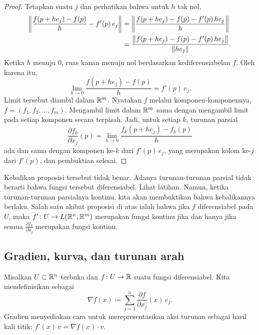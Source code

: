 \begin{proof}
Tetapkan suatu $j$ dan perhatikan bahwa untuk $h$ tak nol,
\begin{equation*}
\begin{split}
\left\lVert {\frac{f(p+h e_j)-f(p)}{h} - f'(p) \, e_j} \right\rVert & = 
\left\lVert {\frac{f(p+h e_j)-f(p) - f'(p) \, h e_j}{h}} \right\rVert \\
& =
\frac{\bigl\lVert {f(p+h e_j)-f(p) - f'(p) \, h e_j} \bigr\rVert}{\lVert {h e_j} \rVert} .
\end{split}
\end{equation*}
Ketika $h$ menuju 0, ruas kanan menuju nol berdasarkan
kediferensiabelan $f$.  Oleh karena itu,
\begin{equation*}
\lim_{h \to 0}
\frac{f(p+h e_j)-f(p)}{h} = f'(p) \, e_j  .
\end{equation*}
Limit tersebut diambil dalam ${\mathbb{R}}^m$.
Nyatakan $f$ melalui komponen-komponennya,
$f = (f_1,f_2,\ldots,f_m)$.
Mengambil limit dalam ${\mathbb{R}}^m$
sama dengan mengambil limit pada setiap komponen secara terpisah.
Jadi, untuk setiap $k$,
turunan parsial
\begin{equation*}
\frac{\partial f_k}{\partial x_j} (p)
=
\lim_{h \to 0}
\frac{f_k(p+h e_j)-f_k(p)}{h}
\end{equation*}
ada dan sama dengan komponen ke-$k$ dari $f'(p)\, e_j$, yang merupakan
kolom ke-$j$ dari $f'(p)$,
dan pembuktian selesai.
\end{proof}

Kebalikan proposisi tersebut tidak benar.  Adanya turunan-turunan parsial
tidak berarti bahwa fungsi tersebut diferensiabel.  Lihat
latihan.
Namun, ketika turunan-turunan parsialnya kontinu, kita akan membuktikan bahwa
kebalikannya berlaku.
Salah satu akibat proposisi di atas ialah bahwa jika $f$
diferensiabel pada $U$, maka $f' \colon U \to
L({\mathbb{R}}^n,{\mathbb{R}}^m)$ merupakan fungsi kontinu jika dan hanya jika
semua $\frac{\partial f_k}{\partial x_j}$ merupakan fungsi kontinu.

\subsection{Gradien, kurva, dan turunan arah}

Misalkan $U \subset {\mathbb{R}}^n$ terbuka dan $f \colon U \to {\mathbb{R}}$ suatu fungsi
diferensiabel.  Kita mendefinisikan
\emph{} sebagai
\begin{equation*}
\nabla f (x) \coloneqq \sum_{j=1}^n \frac{\partial f}{\partial x_j} (x)\, e_j .
\end{equation*}
Gradien menyediakan cara untuk merepresentasikan aksi
turunan sebagai hasil kali titik: $f'(x)\,v = \nabla f(x) \cdot v$.

